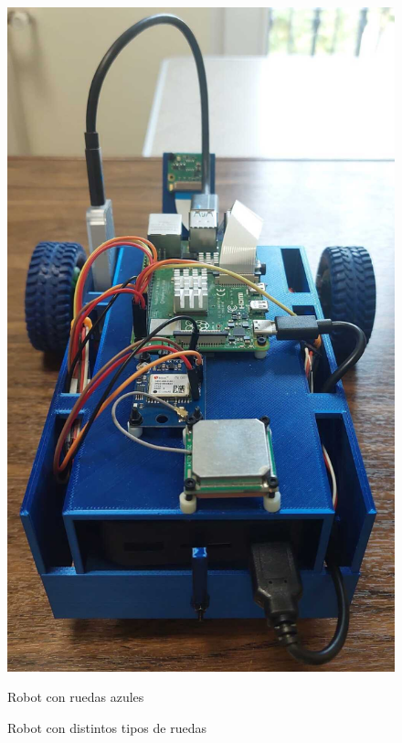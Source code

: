\begin{figure}[ht!]
\begin{minipage}{0.30\linewidth}
		\includegraphics[width=\linewidth]{figs/cap5/ra.jpeg}
		\caption*{\centering Robot con ruedas azules}
	\end{minipage}
	\caption{Robot con distintos tipos de ruedas}
	\label{fig:robot}
\end{figure}



